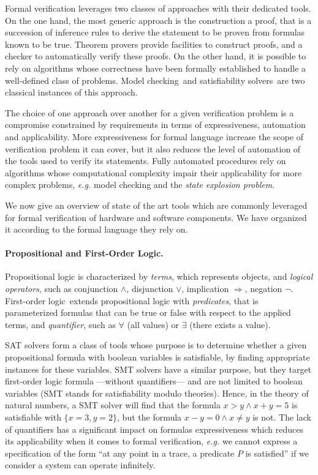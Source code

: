 Formal verification leverages two classes of approaches with their dedicated
tools.
%
On the one hand, the most generic approach is the construction a proof, that is
a succession of inference rules to derive the statement to be proven from
formulas known to be true.
%
Theorem provers provide facilities to construct proofs, and a checker to
automatically verify these proofs.
%
On the other hand, it is possible to rely on algorithms whose correctness have
been formally established to handle a well-defined class of problems.
%
Model checking\,\cite{clarke2018modelc} and satisfiability
solvers\,\cite{gomes2008satisfiability} are two classical instances of this
approach.

The choice of one approach over another for a given verification problem is a
compromise constrained by requirements in terms of expressiveness, automation
and applicability.
%
More expressiveness for formal language increase the scope of verification
problem it can cover, but it also reduces the level of automation of the tools
used to verify its statements.
%
Fully automated procedures rely on algorithms whose computational complexity
impair their applicability for more complex problems, \emph{e.g.}  model
checking and the \emph{state explosion problem}.

We now give an overview of state of the art tools which are commonly leveraged
for formal verification of hardware and software components.
%
We have organized it according to the formal language they rely on.

\paragraph{Propositional and First-Order Logic.}
%
Propositional logic is characterized by \emph{terms}, which represents objects,
and \emph{logical operators}, such as conjunction \( \wedge \), disjunction
\( \vee \), implication \( \Rightarrow \), negation \( \neg \).
%
First-order logic\,\cite{smullyan2012fol} extends propositional logic with
\emph{predicates}, that is parameterized formulas that can be true or false with
respect to the applied terms, and \emph{quantifier}, such as \( \forall \) (all
values) or \( \exists \) (there exists a value).

SAT solvers form a class of tools whose purpose is to determine whether a
given propositional formula with boolean variables is satisfiable, by finding
appropriate instances for these variables.
%
SMT solvers have a similar purpose, but they target first-order logic formula
---without quantifiers--- and are not limited to boolean variables (SMT stands
for satisfiability modulo theories).
%
Hence, in the theory of natural numbers, a SMT solver will find that the formula
\( x > y \wedge x + y = 5 \) is satisfiable with \( \{ x = 3, y = 2 \} \), but
the formula \( x - y = 0 \wedge x \neq y \) is not.
%
The lack of quantifiers has a significant impact on formulas expressiveness
which reduces its applicability when it comes to formal verification,
\emph{e.g.} we cannot express a specification of the form ``at any point in a
trace, a predicate \( P \) is satisfied'' if we consider a system can operate
infinitely.

